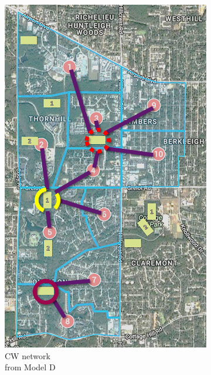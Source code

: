 \documentclass[preprint,12pt,authoryear]{elsarticle}
\begin{document}
\begin{figure}[!htb]
	\captionsetup[subfigure]{justification=centering}
	\centering
	\begin{subfigure}[b]{0.4\textwidth}
		\includegraphics[width=\textwidth]{d.png}
		\caption{CW network\\ from Model D}
		\label{fig:networkd}
	\end{subfigure}	
	\begin{subfigure}[b]{0.4\textwidth}

\end{subfigure}
\end{figure}
\end{document}

